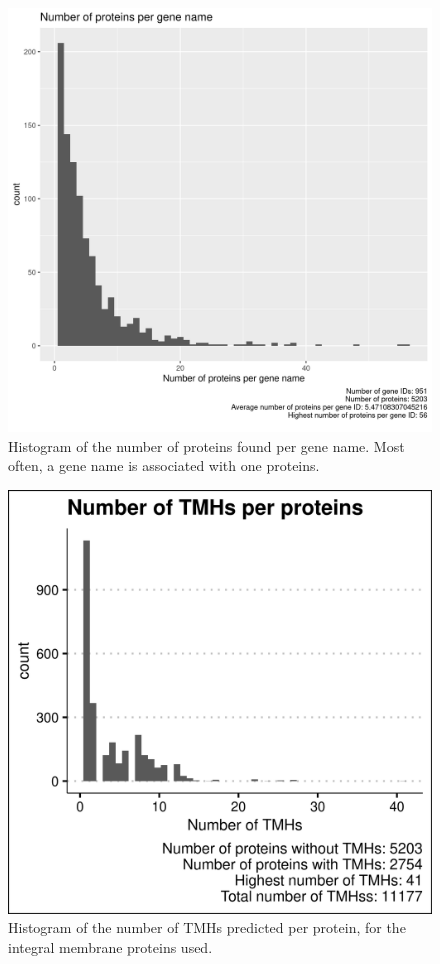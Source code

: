 \begin{figure}[!htbp]
  \includegraphics[width=\textwidth]{ncbi_peregrine_results/fig_n_proteins_per_gene_name.png}
  \caption{
    Histogram of the number of proteins found per gene name.
    Most often, a gene name is associated with one proteins. 
  }
  \label{fig:n_proteins_per_gene_name}
\end{figure}

\begin{figure}[!htbp]
  \includegraphics[width=\textwidth]{ncbi_peregrine_results/fig_n_tmhs_per_protein.png}
  \caption{
    Histogram of the number of TMHs predicted per protein,
    for the integral membrane proteins used.
  }
  \label{fig:n_tmhs_per_protein}
\end{figure}

